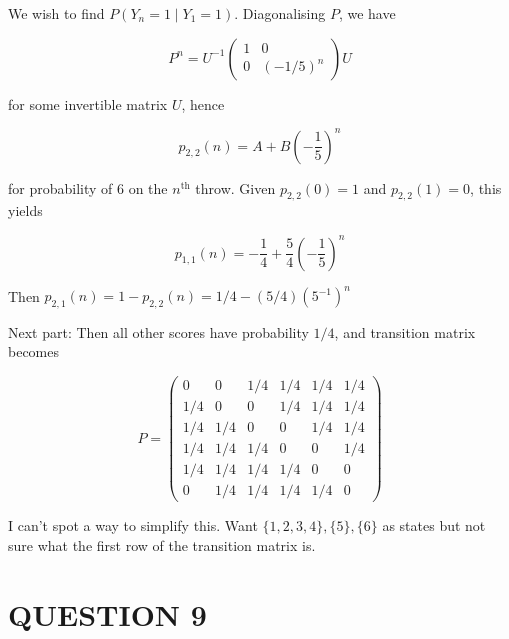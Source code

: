 \documentclass[a4paper]{article}
\begin{document}
We wish to find $ P(Y_{n} = 1 \; | \; Y_{1} = 1) $. Diagonalising $ P $, we have

\[ P^{n} = U^{-1}  \begin{pmatrix}
1 & 0 \\
0 & (-1/5)^{n}
\end{pmatrix} U  \]

for some invertible matrix $ U $, hence

\[ p_{2,2}(n) = A + B \left( - \frac{1}{5} \right)^{n}  \]


for probability of 6 on the $ n^{\text{th}} $  throw.  Given $ p_{2,2}(0) = 1 $ and $ p_{2,2}(1) = 0 $, this yields


\[ p_{1,1}(n) = - \frac{1}{4} + \frac{5}{4} \left( - \frac{1}{5} \right)^{n} \]

Then $ p_{2,1}(n) = 1 - p_{2,2}(n) = 1/4  - (5/4) ( 5^{-1})^{n} $

Next part: Then all other scores have probability $ 1/4 $, and transition matrix becomes 

\[ P = \begin{pmatrix}
0 & 0 & 1/4 & 1/4 & 1/4 & 1/4 \\
1/4 & 0 & 0 & 1/4 & 1/4 & 1/4 \\
1/4 & 1/4 & 0 & 0 & 1/4 & 1/4 \\
1/4 & 1/4 & 1/4 & 0 & 0 & 1/4 \\
1/4 & 1/4 & 1/4 & 1/4 & 0 & 0 \\
0 & 1/4 & 1/4 & 1/4 & 1/4 & 0
\end{pmatrix} \]


I can't spot a way to simplify this. Want $ \{ 1,2,3,4 \}, \{ 5 \}, \{ 6 \}$ as states but not sure what the first row of the transition matrix is. 
\section{QUESTION 9}
\end{document}
